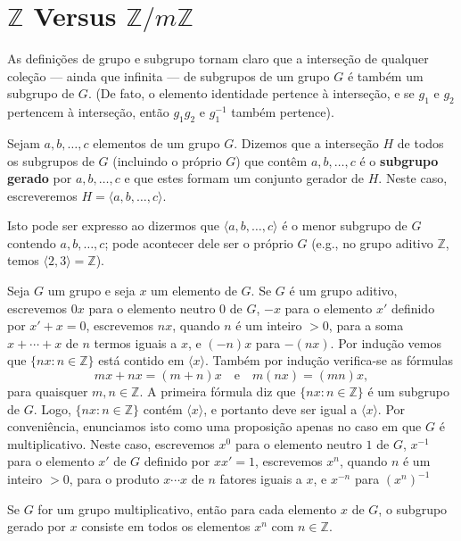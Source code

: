 \section{\texorpdfstring{$\mathbb{Z}$}{Z} Versus \texorpdfstring{$\mathbb{Z}/m\mathbb{Z}$}{Z/mZ}}

As definições de grupo e subgrupo tornam claro que a interseção de qualquer coleção --- 
ainda que infinita --- de subgrupos de um grupo $G$ é também um subgrupo de $G$. (De fato, 
o elemento identidade pertence à interseção, e se $g_1$ e $g_2$ pertencem à interseção, então 
$g_1 g_2 \text{ e } g_1^{-1}$ também pertence).

\begin{definicao}
Sejam $a, b, \ldots, c$ elementos de um grupo $G$. Dizemos que a interseção $H$ de todos os 
subgrupos de $G$ (incluindo o próprio $G$) que contêm $a, b, \ldots, c$ é o \textbf{subgrupo gerado} por 
$a, b, \ldots, c$ e que estes formam um conjunto gerador de $H$. Neste caso, escreveremos
$H = \langle a, b, \ldots, c \rangle$.
\end{definicao}

Isto pode ser expresso ao dizermos que $\langle a, b, \ldots, c \rangle$ é o menor subgrupo de $G$ 
contendo $a, b, \ldots, c$; pode acontecer dele ser o próprio $G$ (e.g., no grupo aditivo $\mathbb{Z}$, 
temos $\langle 2, 3 \rangle = \mathbb{Z}$).

Seja $G$ um grupo e seja $x$ um elemento de $G$. Se $G$ é um grupo aditivo, escrevemos $0x$ para o elemento 
neutro $0$ de $G$, $-x$ para o elemento $x'$ definido por $x' + x = 0$, escrevemos $nx$, quando $n$ é um inteiro 
$> 0$, para a soma $x + \cdots + x$ de $n$ termos iguais a $x$, e $(-n)x$ para $-(nx)$. Por indução vemos que
$\{ nx : n \in \mathbb{Z} \}$ está contido em $\langle x \rangle$. Também por indução verifica-se as fórmulas
\[
mx + nx = (m+n)x
\quad \text{e} \quad
m(nx) = (mn)x,
\]
para quaisquer $m, n \in \mathbb{Z}$. A primeira fórmula diz que $\{ nx : n \in \mathbb{Z} \}$ é um subgrupo de $G$. Logo,
$\{ nx : n \in \mathbb{Z} \}$ contém $\langle x \rangle$, e portanto deve ser igual a $\langle x \rangle$.
Por conveniência, enunciamos isto como uma proposição apenas no caso em que $G$ é multiplicativo. Neste caso, 
escrevemos $x^0$ para o elemento neutro $1$ de $G$, $x^{-1}$ para o elemento $x'$ de $G$ definido por $x x' = 1$, 
escrevemos $x^n$, quando $n$ é um inteiro $> 0$, para o produto
$x \cdots x$ de $n$ fatores iguais a $x$, e $x^{-n}$ para $(x^n)^{-1}$

\begin{proposicao}
Se $G$ for um grupo multiplicativo, então para cada elemento $x$ de $G$, o subgrupo gerado por $x$ consiste 
em todos os elementos $x^n$ com $n \in \mathbb{Z}$.
\end{proposicao}

